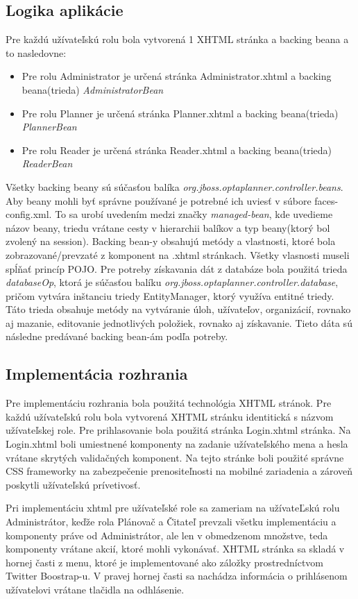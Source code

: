\subsection{Logika aplikácie}
Pre každú užívateľskú rolu bola vytvorená 1 XHTML stránka a backing beana a to nasledovne:
\begin{itemize}
\item Pre rolu Administrator je určená stránka Administrator.xhtml a backing beana(trieda) \emph{AdministratorBean}
\item Pre rolu Planner je určená stránka Planner.xhtml a backing beana(trieda) \emph{PlannerBean}
\item Pre rolu Reader je určená stránka Reader.xhtml a backing beana(trieda) \emph{ReaderBean}
\end{itemize}
Všetky backing beany sú súčasťou balíka \emph{org.jboss.optaplanner.controller.beans}. Aby beany mohli byť správne používané je potrebné ich uviesť v súbore faces-config.xml. To sa urobí uvedením medzi značky \emph{managed-bean}, kde uvedieme názov beany, triedu vrátane cesty v hierarchii balíkov a typ beany(ktorý bol zvolený na session). Backing bean-y obsahujú metódy a vlastnosti, ktoré bola zobrazované/prevzaté z komponent na .xhtml stránkach. Všetky vlasnosti museli spĺňať princíp POJO. Pre potreby získavania dát z databáze bola použitá trieda \emph{databaseOp}, ktorá je súčasťou balíku \emph{org.jboss.optaplanner.controller.database}, pričom vytvára inštanciu triedy EntityManager, ktorý využíva entitné triedy. Táto trieda obsahuje metódy na vytváranie úloh, užívateľov, organizácií, rovnako aj mazanie, editovanie jednotlivých položiek, rovnako aj získavanie. Tieto dáta sú následne predávané backing bean-ám podľa potreby.


\subsection{Implementácia rozhrania}
Pre implementáciu rozhrania bola použitá technológia XHTML stránok. Pre každú užívateľskú rolu bola vytvorená XHTML stránku identitická s názvom užívateľskej role. Pre prihlasovanie bola použitá  stránka Login.xhtml stránka. Na Login.xhtml boli umiestnené komponenty na zadanie užívateľského mena a hesla vrátane skrytých validačných komponent. Na tejto stránke boli použité správne CSS frameworky na zabezpečenie prenositeľnosti na mobilné zariadenia a zároveň poskytli užívateľskú prívetivosť.

Pri implementáciu xhtml pre užívateľské role sa zameriam na užívateĽskú rolu Administrátor, keďže rola Plánovač a Čitateľ prevzali všetku implementáciu a komponenty práve od Administrátor, ale len v obmedzenom množstve, teda komponenty vrátane akcií, ktoré mohli vykonávať. XHTML stránka sa skladá v hornej časti z menu, ktoré je implementované ako záložky prostredníctvom Twitter Boostrap-u. V pravej hornej časti sa nachádza informácia o prihlásenom užívatelovi vrátane tlačidla na odhlásenie.  


